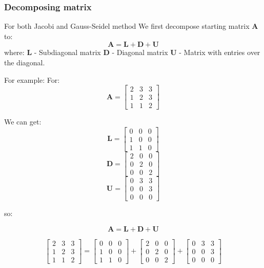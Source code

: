 \documentclass{report}
\begin{document}
\subsubsection{Decomposing matrix}
For both Jacobi and Gauss-Seidel method We first decompose starting matrix $ \mathbf{A} $ to:
\[ \mathbf{A} = \mathbf{L} + \mathbf{D} + \mathbf{U} \]
where:
$ \mathbf{L} $ - Subdiagonal matrix
$ \mathbf{D} $ - Diagonal matrix
$ \mathbf{U} $ - Matrix with entries over the diagonal.

For example:
For:
\[ \mathbf{A} = \begin{bmatrix}
2 & 3 & 3\\
1 & 2 & 3\\
1 & 1 & 2
\end{bmatrix}
\]

We can get:
\[ \mathbf{L} = \begin{bmatrix}
0 & 0 & 0\\
1 & 0 & 0\\
1 & 1 & 0
\end{bmatrix}
\]
\[ \mathbf{D} = \begin{bmatrix}
2 & 0 & 0\\
0 & 2 & 0\\
0 & 0 & 2
\end{bmatrix}
\]
\[ \mathbf{U} = \begin{bmatrix}
0 & 3 & 3\\
0 & 0 & 3\\
0 & 0 & 0
\end{bmatrix}
\]

so:

\[ \mathbf{A} = \mathbf{L} + \mathbf{D} + \mathbf{U} \]

\[
\begin{bmatrix}
2 & 3 & 3\\
1 & 2 & 3\\
1 & 1 & 2
\end{bmatrix}
=
\begin{bmatrix}
0 & 0 & 0\\
1 & 0 & 0\\
1 & 1 & 0
\end{bmatrix}
+
\begin{bmatrix}
2 & 0 & 0\\
0 & 2 & 0\\
0 & 0 & 2
\end{bmatrix}
+
\begin{bmatrix}
0 & 3 & 3\\
0 & 0 & 3\\
0 & 0 & 0
\end{bmatrix}
\]
\end{document}
